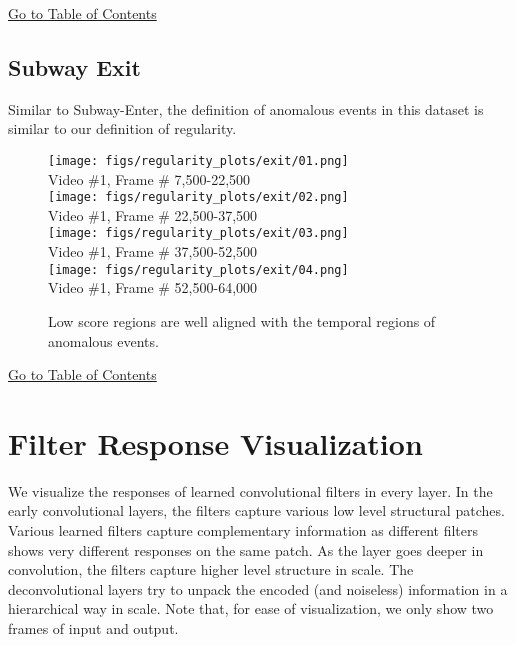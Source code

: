 \documentclass[10pt,twocolumn,letterpaper]{article}
\begin{document}
\begin{center}
	\hyperlink{page.11}{Go to Table of Contents}
\end{center}

\clearpage

\subsection{Subway Exit}
\label{sec:anomaly_exit}
Similar to Subway-Enter, the definition of anomalous events in this dataset is similar to our definition of regularity.

\begin{figure}[h]
	\centering
	\texttt{[image: figs/regularity\_plots/exit/01.png]}\\
	{\footnotesize Video \#1, Frame \# 7,500-22,500}\\
	\texttt{[image: figs/regularity\_plots/exit/02.png]}\\
	{\footnotesize Video \#1, Frame \# 22,500-37,500}\\
	\texttt{[image: figs/regularity\_plots/exit/03.png]}\\
	{\footnotesize Video \#1, Frame \# 37,500-52,500}\\
	\texttt{[image: figs/regularity\_plots/exit/04.png]}\\
	{\footnotesize Video \#1, Frame \# 52,500-64,000}\\
	\caption{Low score regions are well aligned with the temporal regions of anomalous events.}
\end{figure}

\begin{center}
	\hyperlink{page.11}{Go to Table of Contents}
\end{center}

\clearpage 

\newcommand{\dl}{0.17}
\newcommand{\caaal}{0.14}
\newcommand{\cbl}{0.11}
\newcommand{\ccl}{0.08}

\newcommand{\dla}{0.15}
\newcommand{\caaala}{0.12}
\newcommand{\cbla}{0.09}
\newcommand{\ccla}{0.06}

\section{Filter Response Visualization}
\label{sec:filter_res_vis}
We visualize the responses of learned convolutional filters in every layer.
In the early convolutional layers, the filters capture various low level structural patches. 
Various learned filters capture complementary information as different filters shows very different responses on the same patch.
As the layer goes deeper in convolution, the filters capture higher level structure in scale.
The deconvolutional layers try to unpack the encoded (and noiseless) information in a hierarchical way in scale.
Note that, for ease of visualization, we only show two frames of input and output.
\end{document}
